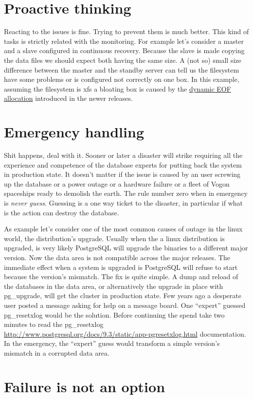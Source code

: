 \section{Proactive thinking}
Reacting to the issues is fine. Trying to prevent them is much better. This kind of tasks is strictly 
related with the monitoring. For example let's consider a master and a slave configured in continuous 
recovery. Because the slave is made copying the data files we should expect both having the same size. 
A (not so) small size difference between the master and the standby server can tell us the filesystem have 
some problems or is configured not correctly on one box. In this example, assuming the filesystem is xfs a 
bloating box is caused by the 
\href{
http://serverfault.com/questions/406069/why-are-my-xfs-filesystems-suddenly-consuming-more-space-and-full-of
-sparse-file}{dynamic EOF allocation} introduced in the newer releases.

\section{Emergency handling}
Shit happens, deal with it. Sooner or later a disaster will strike requiring all the experience and 
competence of the database experts for putting back the system in production state. It doesn't matter if the 
issue is caused by an user screwing up the database or a power outage or a hardware failure or a fleet of 
Vogon spaceships ready to demolish the earth. The rule number zero when in emergency is \textit{never 
guess}. Guessing is a one way ticket to the disaster, in particular if what is the action 
can destroy the database.\newline

As example let's consider one of the most common causes of outage in the linux world, the distribution's 
upgrade. Usually when the a linux distribution is upgraded, is very likely PostgreSQL will upgrade the 
binaries to a different major version. Now the data area is not compatible across the major releases. The 
immediate effect when a system is upgraded is PostgreSQL will refuse to start because the version's 
mismatch. The fix is quite simple. A dump and reload of the databases in the data area, or alternatively 
the upgrade in place with pg\_upgrade, will get the cluster in production state. Few years ago a 
desperate user posted a message asking for help on a message board. One ``expert'' guessed 
pg\_resetxlog would be the solution. Before continuing the spend take two minutes to  read the 
pg\_resetxlog 
\href{http://www.postgresql.org/docs/9.3/static/app-pgresetxlog.html}{
http://www.postgresql.org/docs/9.3/static/app-pgresetxlog.html} documentation. In the emergency, the 
``expert'' guess would transform a simple version's mismatch in a corrupted data area.


\section{Failure is not an option}